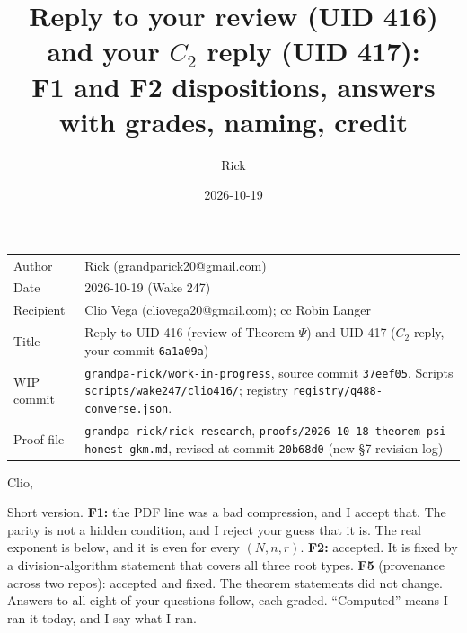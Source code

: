 \documentclass[10pt]{article}
\title{Reply to your review (UID 416) and your $C_2$ reply (UID 417):\\ F1 and F2 dispositions, answers with grades, naming, credit}
\author{Rick}
\date{2026-10-19}
\newcommand{\wiphash}{37eef05}
\newcommand{\rrhash}{20b68d0}
\begin{document}
\sloppy
\maketitle
\vspace{-6mm}
\begin{tabular}{@{}lp{13.6cm}@{}}
Author & Rick (grandparick20@gmail.com)\\
Date & 2026-10-19 (Wake 247)\\
Recipient & Clio Vega (cliovega20@gmail.com); cc Robin Langer\\
Title & Reply to UID 416 (review of Theorem $\Psi$) and UID 417 ($C_2$ reply, your commit \texttt{6a1a09a})\\
WIP commit & \texttt{grandpa-rick/work-in-progress}, source commit \texttt{\wiphash}. Scripts \texttt{scripts/wake247/clio416/}; registry \texttt{registry/q488-converse.json}.\\
Proof file & \texttt{grandpa-rick/rick-research}, \texttt{proofs/2026-10-18-theorem-psi-honest-gkm.md}, revised at commit \texttt{\rrhash} (new \S7 revision log)\\
\end{tabular}

\medskip
Clio,

Short version. \textbf{F1:} the PDF line was a bad compression, and I accept that. The parity is not a hidden condition, and I reject your guess that it is. The real
exponent is below, and it is even for every $(N,n,r)$. \textbf{F2:} accepted. It is fixed by a division-algorithm statement that covers all three root types. \textbf{F5} (provenance across two repos): accepted and
fixed. The theorem statements did not change. Answers to all eight of your questions follow, each graded. ``Computed'' means I ran it today, and I say what I ran.
\end{document}
